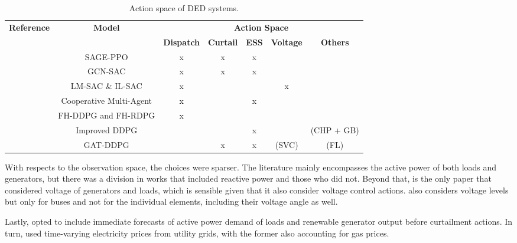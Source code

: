   \begin{table}[H]
	\centering
	\caption{Action space of \ac{DED} systems.}
	\begin{tabular}{ccccccc}
		\toprule
		\multirow{2}{*}{\textbf{Reference}} & \multirow{2}{*}{\textbf{Model}} & \multicolumn{5}{c}{\textbf{Action Space}} \\ 
		\cmidrule(lr){3-7}
 		&  &  \textbf{Dispatch} & \textbf{Curtail} & \textbf{ESS} & \textbf{Voltage} & \textbf{Others} \\ 
		\midrule
		\cite{zhaoGraphbasedDeepReinforcement2022} & SAGE-PPO & x & x & x & & \\
		\cite{liNovelGraphReinforcement2022, chenScalableGraphReinforcement2023} & GCN-SAC & x & x & x & & \\
		\cite{hanAutonomousControlTechnology2023} & LM-SAC \& IL-SAC & x & & & x & \\
		\cite{liuDistributedEconomicDispatch2018} &  Cooperative Multi-Agent & x & & x & & \\
		\cite{leiDynamicEnergyDispatch2021} & FH-DDPG and FH-RDPG & x & & & & \\
		\cite{yangDynamicEnergyDispatch2021} & Improved DDPG & & & x & & (CHP + GB) \\
		\cite{xingRealtimeOptimalScheduling2023} & GAT-DDPG & & x & x & (SVC) & (FL) \\
		\bottomrule
	\end{tabular}
	\label{tab:ded-action}
\end{table}

With respects to the observation space, the choices were sparser. The literature mainly encompasses the active power of both loads and generators, but there was a division in works that included reactive power and those who did not. Beyond that, \cite{hanAutonomousControlTechnology2023} is the only paper that considered voltage of generators and loads, which is sensible given that it also consider voltage control actions. \cite{zhaoGraphbasedDeepReinforcement2022} also considers voltage levels but only for buses and not for the individual elements, including their voltage angle as well. \par
Lastly, \cite{hanAutonomousControlTechnology2023} opted to include immediate forecasts of active power demand of loads and renewable generator output before curtailment actions. In turn, \cite{liuDistributedEconomicDispatch2018, yangDynamicEnergyDispatch2021} used time-varying electricity prices from utility grids, with the former also accounting for gas prices. \par



